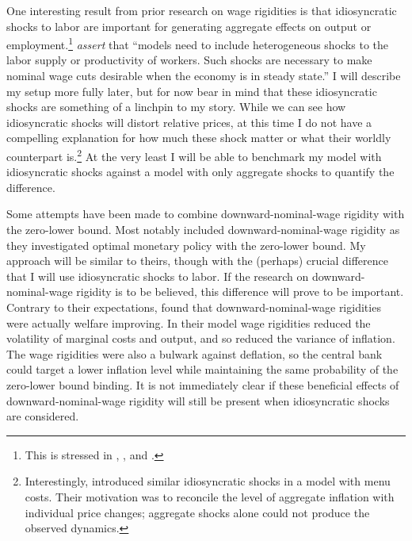 \documentclass[12pt,a4paper]{scrartcl}            %
\begin{document}
One interesting result from prior research on wage rigidities is that idiosyncratic shocks to labor are important for generating aggregate effects on output or employment.\footnote{This is stressed in \cite{elsby_2009}, \cite{benigno_ricci_2011}, and \cite{daly_hobijn_2013}.}
\cite{daly_hobijn_2013} \emph{assert} that ``models need to include heterogeneous shocks to the labor supply or productivity of workers. Such shocks are necessary to make nominal wage cuts desirable when the economy is in steady state.''
I will describe my setup more fully later, but for now bear in mind that these idiosyncratic shocks are something of a linchpin to my story.
While we can see how idiosyncratic shocks will distort relative prices, at this time I do not have a compelling explanation for how much these shock matter or what their worldly counterpart is.\footnote{
Interestingly, \cite{golosov_lucas_2007} introduced similar idiosyncratic shocks in a model with menu costs.
Their motivation was to reconcile the level of aggregate inflation with individual price changes;
aggregate shocks alone could not produce the observed dynamics.
}
At the very least I will be able to benchmark my model with idiosyncratic shocks against a model with only aggregate shocks to quantify the difference.


Some attempts have been made to combine downward-nominal-wage rigidity with the zero-lower bound.
Most notably \cite{coibon_gorodnichenko_wieland_2012} included downward-nominal-wage rigidity as they investigated optimal monetary policy with the zero-lower bound.
My approach will be similar to theirs, though with the (perhaps) crucial difference that I will use idiosyncratic shocks to labor.
If the research on downward-nominal-wage rigidity is to be believed, this difference will prove to be important.
Contrary to their expectations, \cite{coibon_gorodnichenko_wieland_2012} found that downward-nominal-wage rigidities were actually welfare improving.
In their model wage rigidities reduced the volatility of marginal costs and output, and so reduced the variance of inflation.
The wage rigidities were also a bulwark against deflation, so the central bank could target a lower inflation level while maintaining the same probability of the zero-lower bound binding.
It is not immediately clear if these beneficial effects of downward-nominal-wage rigidity will still be present when idiosyncratic shocks are considered.
\end{document}
